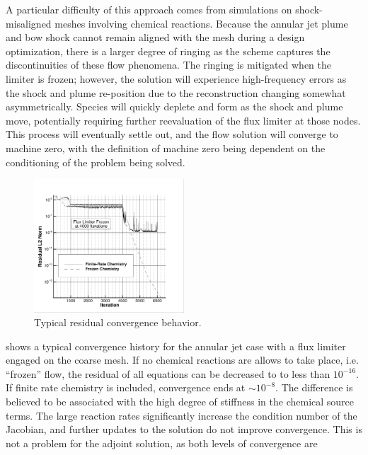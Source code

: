 A particular difficulty of this approach comes from simulations on
shock-misaligned meshes involving chemical reactions.  Because the annular jet
plume and bow shock cannot remain aligned with the mesh during a design
optimization, there is a larger degree of ringing as the scheme captures the
discontinuities of these flow phenomena.  The ringing is mitigated when the
limiter is frozen; however, the solution will experience high-frequency errors
as the shock and plume re-position due to the reconstruction changing somewhat
asymmetrically.  Species will quickly deplete and form as the shock and plume
move, potentially requiring further reevaluation of the flux limiter at those
nodes.  This process will eventually settle out, and the flow solution will
converge to machine zero, with the definition of machine zero being dependent on
the conditioning of the problem being solved.  
\begin{figure}[h]
  \centering
  \includegraphics[width=0.5\textwidth]{figures/limiters/chem-res-comp.png}
  \caption{Typical residual convergence behavior.}
  \label{fig:chem-res-comp}
\end{figure}
 shows a typical convergence history for the annular jet
case with a flux limiter engaged on the coarse mesh.  If no chemical reactions
are allows to take place, i.e. ``frozen'' flow, the residual of all equations
can be decreased to to less than $10^{-16}$.  If finite rate chemistry is
included, convergence ends at $\sim 10^{-8}$.  The difference is believed to be
associated with the high degree of stiffness in the chemical source terms.  The
large reaction rates significantly increase the condition number of the
Jacobian, and further updates to the solution do not improve convergence.  This
is not a problem for the adjoint solution, as both levels of convergence are

